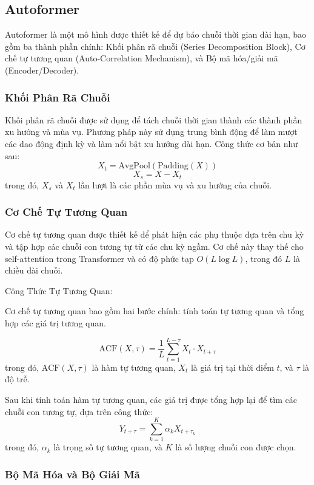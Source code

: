 \subsection{Autoformer}

Autoformer là một mô hình được thiết kế để dự báo chuỗi thời gian dài hạn, bao gồm ba thành phần chính: Khối phân rã chuỗi (Series Decomposition Block), Cơ chế tự tương quan (Auto-Correlation Mechanism), và Bộ mã hóa/giải mã (Encoder/Decoder).

\subsubsection{Khối Phân Rã Chuỗi}

Khối phân rã chuỗi được sử dụng để tách chuỗi thời gian thành các thành phần xu hướng và mùa vụ. Phương pháp này sử dụng trung bình động để làm mượt các dao động định kỳ và làm nổi bật xu hướng dài hạn. Công thức cơ bản như sau:
\[
X_t = \text{AvgPool}(\text{Padding}(X))
\]
\[
X_s = X - X_t
\]
trong đó, $X_s$ và $X_t$ lần lượt là các phần mùa vụ và xu hướng của chuỗi.

\subsubsection{Cơ Chế Tự Tương Quan}

Cơ chế tự tương quan được thiết kế để phát hiện các phụ thuộc dựa trên chu kỳ và tập hợp các chuỗi con tương tự từ các chu kỳ ngầm. Cơ chế này thay thế cho self-attention trong Transformer và có độ phức tạp $O(L \log L)$, trong đó $L$ là chiều dài chuỗi.

Công Thức Tự Tương Quan: 

Cơ chế tự tương quan bao gồm hai bước chính: tính toán tự tương quan và tổng hợp các giá trị tương quan.

\[
\text{ACF}(X, \tau) = \frac{1}{L} \sum_{t=1}^{L-\tau} X_t \cdot X_{t+\tau}
\]
trong đó, $\text{ACF}(X, \tau)$ là hàm tự tương quan, $X_t$ là giá trị tại thời điểm $t$, và $\tau$ là độ trễ.

Sau khi tính toán hàm tự tương quan, các giá trị được tổng hợp lại để tìm các chuỗi con tương tự, dựa trên công thức:
\[
Y_{t+\tau} = \sum_{k=1}^{K} \alpha_k X_{t+\tau_k}
\]
trong đó, $\alpha_k$ là trọng số tự tương quan, và $K$ là số lượng chuỗi con được chọn.

\subsubsection{Bộ Mã Hóa và Bộ Giải Mã}


